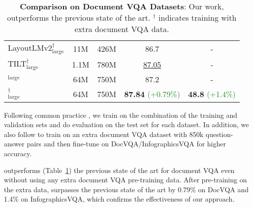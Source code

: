 \documentclass[10pt,twocolumn,letterpaper]{article}
\begin{document}
\begin{table}[htbp]
{\begin{tabular}{l|c|c|c|c}
  LayoutLMv2$_{\text{large}}^{\dagger}$ \cite{xu2020layoutlmv2} & 11M & 426M & 86.7 & - \\
  TILT$_{\text{large}}^{\dagger}$ \cite{powalski2021going} & 1.1M & 780M & \underline{87.05} & - \\
  \midrule
\papertitlenospace$_{\text{large}}$ & 64M & 750M & 87.2 & - \\
  \papertitlenospace$_{\text{large}}^{\dagger}$ & 64M & 750M & \textbf{87.84} \textcolor{forestgreen}{(+0.79\%)} & \textbf{48.8} \textcolor{forestgreen}{(+1.4\%)} \\
\end{tabular}
}
\caption{\textbf{Comparison on Document VQA Datasets}\cite{mathew2020docvqa,mathew2022infographicvqa}: Our work, \papertitle outperforms the previous state of the art. $^{\dagger}$ indicates training with extra document VQA data.
}
\label{table:docvqa}
\vspace{-0.2cm}
\end{table}


Following common practice \cite{Borchmann2021DUE,powalski2021going,xu2020layoutlmv2}, we train \papertitle on the combination of the training and validation sets and do evaluation on the test set for each dataset.
In addition, we also follow \cite{powalski2021going,xu2020layoutlmv2} to train \papertitle on an extra document VQA dataset with 850k question-answer pairs and then fine-tune on DocVQA/InfographicsVQA for higher accuracy.

\papertitle outperforms (Table~\ref{table:docvqa})  the previous state of the art for document VQA even without using any extra document VQA pre-training data.
After pre-training on the extra data, \papertitle surpasses the previous state of the art by 0.79\% on DocVQA and 1.4\% on InfographicsVQA, which confirms the effectiveness of our approach.
\end{document}
